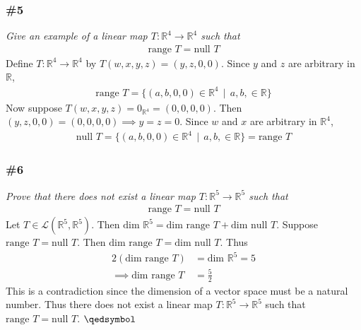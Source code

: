 \documentclass[12pt]{article}
\newcommand{\suchthat}{\, \mid \,}
\begin{document}
\subsubsection*{\#5}
{\it Give an example of a linear map $T: \mathbb{R}^4 \rightarrow \mathbb{R}^4$ such that}
\begin{align*}
\text{range }T = \text{null }T
\end{align*}
Define $T: \mathbb{R}^4 \rightarrow \mathbb{R}^4$ by $T(w, x, y, z) = (y, z, 0, 0)$.  Since $y$ and $z$ are arbitrary in $\mathbb{R}$,
\begin{align*}
\text{range }T = \{(a, b, 0, 0) \in \mathbb{R}^4 \suchthat a, b, \in \mathbb{R}\}
\end{align*}
Now suppose $T(w, x, y, z) = 0_{\mathbb{R}^4} = (0, 0, 0, 0)$.  Then $(y, z, 0, 0) = (0, 0, 0, 0) \implies y = z = 0$.  Since $w$ and $x$ are arbitrary in $\mathbb{R}^4$,
\begin{align*}
\text{null }T = \{(a, b, 0, 0) \in \mathbb{R}^4 \suchthat a, b, \in \mathbb{R}\} = \text{range } T
\end{align*}

\subsubsection*{\#6}
{\it Prove that there does not exist a linear map $T: \mathbb{R}^5 \rightarrow \mathbb{R}^5$ such that}
\begin{align*}
\text{range }T = \text{null }T
\end{align*}
Let $T \in \mathcal{L}(\mathbb{R}^5, \mathbb{R}^5)$.  Then $\text{dim }\mathbb{R}^5 = \text{dim }\text{range }T + \text{dim }\text{null }T$.  Suppose $ \text{range }T = \text{null }T$.  Then $\text{dim }\text{range }T = \text{dim }\text{null }T$.  Thus
\begin{align*}
2(\text{dim }\text{range }T) &= \text{dim }\mathbb{R}^5 = 5 \\
\implies \text{dim }\text{range }T &= \frac{5}{2}
\end{align*}
This is a contradiction since the dimension of a vector space must be a natural number.  Thus there does not exist a linear map $T: \mathbb{R}^5 \rightarrow \mathbb{R}^5$ such that $\text{range }T = \text{null }T$. $\qedsymbol$

%
%
%
%
%
%
\end{document}
